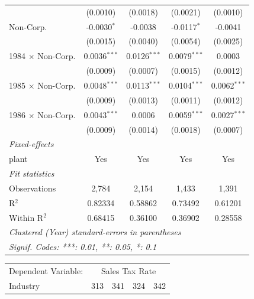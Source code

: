 \documentclass[
  12pt]{article}
\theoremstyle{definition}
\theoremstyle{remark}
\begin{document}
\begin{table}
\begin{minipage}{\linewidth}
\begin{tabular}{lcccc}
                            & (0.0010)       & (0.0018)       & (0.0021)       & (0.0010)\\   
   Non-Corp.                & -0.0030$^{*}$  & -0.0038        & -0.0117$^{*}$  & -0.0041\\   
                            & (0.0015)       & (0.0040)       & (0.0054)       & (0.0025)\\   
   1984 $\times$ Non-Corp.  & 0.0036$^{***}$ & 0.0126$^{***}$ & 0.0079$^{***}$ & 0.0003\\   
                            & (0.0009)       & (0.0007)       & (0.0015)       & (0.0012)\\   
   1985 $\times$ Non-Corp.  & 0.0048$^{***}$ & 0.0113$^{***}$ & 0.0104$^{***}$ & 0.0062$^{***}$\\   
                            & (0.0009)       & (0.0013)       & (0.0011)       & (0.0012)\\   
   1986 $\times$ Non-Corp.  & 0.0043$^{***}$ & 0.0006         & 0.0059$^{***}$ & 0.0027$^{***}$\\   
                            & (0.0009)       & (0.0014)       & (0.0018)       & (0.0007)\\   
   \midrule
   \emph{Fixed-effects}\\
   plant                    & Yes            & Yes            & Yes            & Yes\\  
   \midrule
   \emph{Fit statistics}\\
   Observations             & 2,784          & 2,154          & 1,433          & 1,391\\  
   R$^2$                    & 0.82334        & 0.58862        & 0.73492        & 0.61201\\  
   Within R$^2$             & 0.68415        & 0.36100        & 0.36902        & 0.28558\\  
   \midrule \midrule
   \multicolumn{5}{l}{\emph{Clustered (Year) standard-errors in parentheses}}\\
   \multicolumn{5}{l}{\emph{Signif. Codes: ***: 0.01, **: 0.05, *: 0.1}}\\
\end{tabular}
\par\endgroup
\begingroup
\centering
\begin{tabular}{lcccc}
   \tabularnewline \midrule \midrule
   Dependent Variable: & \multicolumn{4}{c}{Sales Tax Rate}\\
   Industry                 & 313             & 341            & 324             & 342 \\   

\end{tabular}
\end{minipage}
\end{table}
\end{document}
